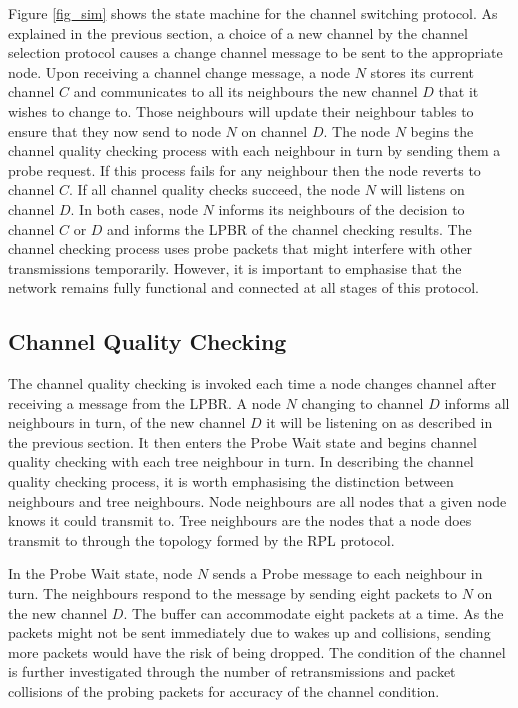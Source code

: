 Figure \ref{fig_sim} shows the state machine for the channel switching protocol.
As explained in the previous section, a choice of a new channel by the channel selection protocol causes a change channel message to be sent to the appropriate node. 
Upon receiving a channel change message, a node $N$ stores its current channel $C$ and communicates to all its neighbours the new channel $D$ that it wishes to change to.  Those neighbours will update their neighbour tables to ensure that they now send to node $N$ on channel $D$.  The node $N$ begins the channel quality checking process with each neighbour in turn by sending them a probe request. If this process fails for any neighbour then the node reverts to channel $C$. If all channel quality checks succeed, the node $N$ will listens on channel $D$. In both cases, node $N$ informs its neighbours of the decision to channel $C$ or $D$ and informs the LPBR of the channel checking results. The channel checking process uses probe packets that might interfere with other transmissions temporarily. However, it is important to emphasise that the network remains fully functional and connected at all stages of this protocol.

\subsection{Channel Quality Checking}
\label{sec:channelquality}

The channel quality checking is invoked each time a node changes channel after receiving a message from the LPBR. A node $N$ changing to channel $D$ informs all neighbours in turn, of the new channel $D$ it will be listening on as described in the previous section. It then enters the Probe Wait state and begins channel quality checking with each tree neighbour in turn. In describing the channel quality checking process, it is worth emphasising the  distinction between neighbours and tree neighbours. Node neighbours are all nodes that a given node knows it could transmit to. Tree neighbours are the nodes that a node does transmit to through the topology formed by the RPL protocol. 

In the Probe Wait state, node $N$ sends a Probe message to each neighbour in turn. The neighbours respond to the message by sending eight packets to $N$ on the new channel $D$. 
The buffer can accommodate eight packets at a time. As the packets might not be sent immediately due to wakes up and collisions, sending more packets would have the risk of being dropped. 
The condition of the channel is further investigated through the number of retransmissions and packet collisions of the probing packets for accuracy of the channel condition. 

